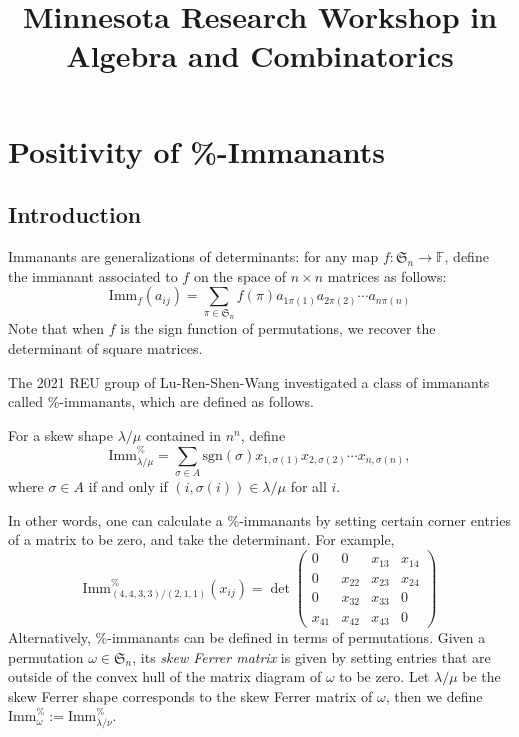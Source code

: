 \documentclass{paper}
\title{Minnesota Research Workshop in Algebra and Combinatorics}
\author{}
\newcommand{\imm}[0]{\text{Imm}}
\begin{document}
	\maketitle
	
\section{Positivity of \%-Immanants}
	\subsection{Introduction}
	Immanants are generalizations of determinants: for any map $f:\mathfrak{S}_n\to \mathbb F$, define the immanant associated to $f$ on the space of $n\times n$ matrices as follows:
	\[\imm_f(a_{ij})=\sum_{\pi\in \mathfrak{S}_n}f(\pi)a_{1\pi(1)}a_{2\pi(2)}\cdots a_{n\pi(n)}\]
	Note that when $f$ is the sign function of permutations, we recover the determinant of square matrices. 
	
	The 2021 REU group of Lu-Ren-Shen-Wang investigated a class of immanants called \%-immanants, which are defined as follows.
	
	\begin{definition}
    For a skew shape $\lambda / \mu$ contained in $n^n $, define
    $$\imm^{\%}_{\lambda/\mu} = \sum_{\sigma \in A} \text{sgn}(\sigma) x_{1, \sigma(1)}x_{2, \sigma(2)}\cdots x_{n, \sigma(n)},$$where $\sigma \in A$ if and only if $(i,\sigma(i)) \in \lambda /\mu$ for all $i$.
    \end{definition}
    In other words, one can calculate a \%-immanants by setting certain corner entries of a matrix to be zero, and take the determinant. For example,
   \begin{equation*}
            \imm^\%_{(4,4,3,3)/(2,1,1)}(x_{ij}) = \det\begin{pmatrix}
                    0 & 0 & x_{13} & x_{14} \\
                    0 & x_{22} & x_{23} & x_{24} \\
                    0 & x_{32} & x_{33} & 0 \\
                    x_{41} & x_{42} & x_{43} & 0
            \end{pmatrix}
        \end{equation*}
 Alternatively, \%-immanants can be defined in terms of permutations. Given a permutation $\omega\in\mathfrak S_n$, its \emph{skew Ferrer matrix} is given by setting entries that are outside of the convex hull of the matrix diagram of $\omega$ to be zero. Let $\lambda/\mu$ be the skew Ferrer shape corresponds to the skew Ferrer matrix of $\omega$, then we define $\imm^\%_\omega:=\imm^\%_{\lambda/\nu}$.  
 
\end{document}
